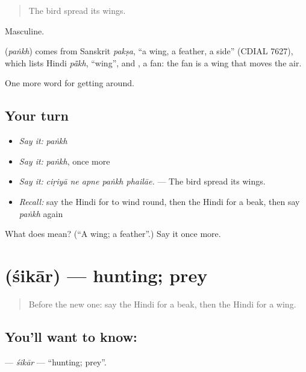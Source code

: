 \begin{quote}
The bird spread its wings.
\end{quote}

Masculine.

\begin{cousinweb}
\textbf{} (\emph{paṅkh}) comes from Sanskrit \emph{pakṣa}, \textquotedblleft{}a wing, a feather, a side\textquotedblright{} (CDIAL 7627), which lists Hindi \emph{pā̃kh}, \textquotedblleft{}wing\textquotedblright{}, and , a fan: the fan is a wing that moves the air.
\end{cousinweb}

\begin{grammarlens}[title={What you've built}]
One more word for getting around.
\end{grammarlens}

\subsection*{Your turn}
\begin{itemize}
\raggedright
  \item \emph{Say it:} \emph{paṅkh}
  \item \emph{Say it:} \emph{paṅkh}, once more
  \item \emph{Say it:} \emph{ciṛiyā ne apne paṅkh phailāe.} — The bird spread its wings.
  \item \emph{Recall:} say the Hindi for to wind round, then the Hindi for a beak, then say \emph{paṅkh} again
\end{itemize}

\begin{tcolorbox}[breakable,colback=teal!4,colframe=teal!35!black,title={Before you move on}]
What does  mean? (\textquotedblleft{}A wing; a feather\textquotedblright{}.) Say it once more.
\end{tcolorbox}
\section[\texorpdfstring{\hi{शिकार} (śikār)}{शिकार (śikār)}]{ (śikār) — hunting; prey}

\label{lesson:HI-C448-sikar}



\begin{quote}
Before the new one: say the Hindi for a beak, then the Hindi for a wing.
\end{quote}

\subsection*{You'll want to know: }
\textbf{} — \emph{śikār} — \textquotedblleft{}hunting; prey\textquotedblright{}.

